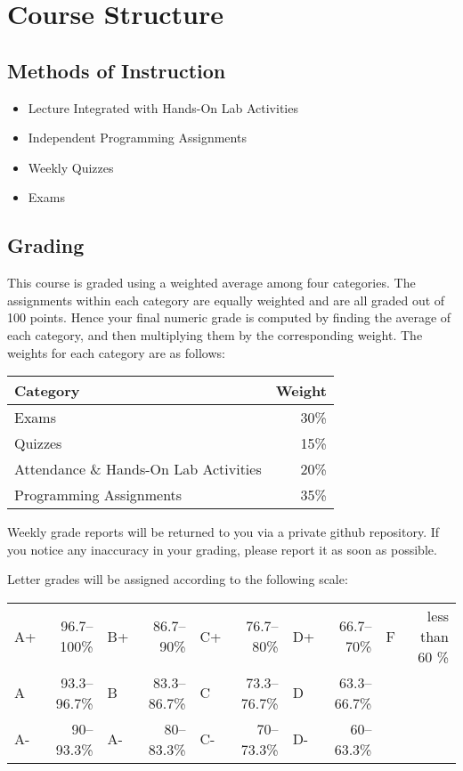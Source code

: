 \documentclass[11pt]{article}
\begin{document}
\section*{Course Structure}
\subsection*{Methods of Instruction}
\begin{itemize}
    \item Lecture Integrated with Hands-On Lab Activities
    \item Independent Programming Assignments
    \item Weekly Quizzes
    \item Exams
\end{itemize}

\subsection*{Grading}
This course is graded using a weighted average among four categories.
The assignments within each category are equally weighted and are all
graded out of 100 points.  Hence your final numeric grade is
computed by finding the average of each category, and then multiplying
them by the corresponding weight.  The weights for each category are
as follows:

\begin{tabular}{|l|r|}
\hline
{\bf Category} & {\bf Weight}\\
\hline
Exams & 30\%\\
\hline
Quizzes & 15\% \\
\hline
Attendance \& Hands-On Lab Activities & 20\% \\
\hline
Programming Assignments & 35\%\\
\hline
\end{tabular}

\vspace{0.25in}

Weekly grade reports will be returned to you via a private github
repository.  If you notice any inaccuracy in your grading, please
report it as soon as possible.  

\vspace{0.25in}

Letter grades will be assigned according to the following scale:

\begin{tabular}{|lr|lr|lr|lr|lr|}
    \hline
    A+ & 96.7--100\% & B+ & 86.7--90\% & C+ & 76.7--80\% & D+ & 66.7--70\% & F & less than 60 \% \\
    A  & 93.3--96.7\% & B & 83.3--86.7\% & C & 73.3--76.7\% & D & 63.3--66.7\% & & \\
    A- & 90--93.3\% & A- & 80--83.3\% & C- & 70--73.3\% & D- & 60--63.3\% & & \\
    \hline
\end{tabular}
\end{document}
